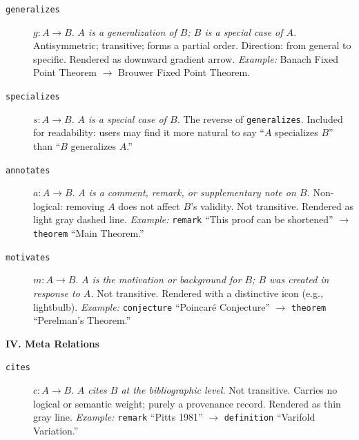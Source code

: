 \begin{description}
\item[\texttt{generalizes}] $g: A \to B$. \emph{$A$ is a generalization of $B$; $B$ is a special case of $A$.} Antisymmetric; transitive; forms a partial order. Direction: from general to specific. Rendered as downward gradient arrow. \emph{Example:} Banach Fixed Point Theorem $\to$ Brouwer Fixed Point Theorem.

\item[\texttt{specializes}] $s: A \to B$. \emph{$A$ is a special case of $B$.} The reverse of \texttt{generalizes}. Included for readability: users may find it more natural to say ``$A$ specializes $B$'' than ``$B$ generalizes $A$.''

\item[\texttt{annotates}] $a: A \to B$. \emph{$A$ is a comment, remark, or supplementary note on $B$.} Non-logical: removing $A$ does not affect $B$'s validity. Not transitive. Rendered as light gray dashed line. \emph{Example:} \texttt{remark} ``This proof can be shortened'' $\to$ \texttt{theorem} ``Main Theorem.''

\item[\texttt{motivates}] $m: A \to B$. \emph{$A$ is the motivation or background for $B$; $B$ was created in response to $A$.} Not transitive. Rendered with a distinctive icon (e.g., lightbulb). \emph{Example:} \texttt{conjecture} ``Poincar\'{e} Conjecture'' $\to$ \texttt{theorem} ``Perelman's Theorem.''
\end{description}

\bigskip
\noindent\textbf{IV. Meta Relations}

\begin{description}
\item[\texttt{cites}] $c: A \to B$. \emph{$A$ cites $B$ at the bibliographic level.} Not transitive. Carries no logical or semantic weight; purely a provenance record. Rendered as thin gray line. \emph{Example:} \texttt{remark} ``Pitts 1981'' $\to$ \texttt{definition} ``Varifold Variation.''
\end{description}
